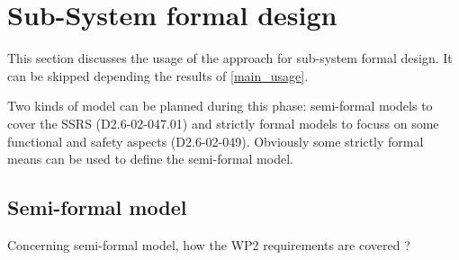 \section{Sub-System formal design}
This section discusses the usage of the approach for sub-system formal design.
It can be skipped depending the results of \ref{main_usage}.

Two kinds of model can be planned during this phase: semi-formal models to  cover the SSRS (D2.6-02-047.01) and strictly formal  models to  focuss on some functional and safety aspects (D2.6-02-049).  Obviously some strictly  formal means can be used to define the semi-formal  model.

\subsection{Semi-formal model}

Concerning semi-formal model, how the WP2 requirements are covered ?

